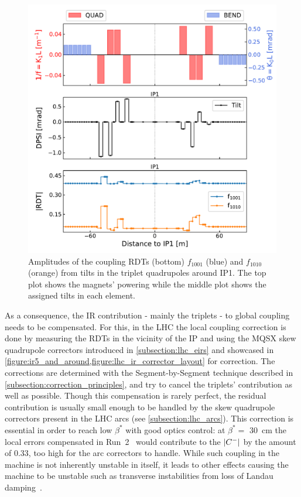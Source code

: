 \begin{figure}[!htb]
    \centering
    \includegraphics*[width=0.99\columnwidth]{Figures/IR_Coupling_Correction/triplet_tilts_to_rdts.pdf}
    \caption{Amplitudes of the coupling RDTs (bottom) \(f_{1001}\) (\textcolor{mplblue}{blue}) and \(f_{1010}\) (\textcolor{mplorange}{orange}) from tilts in the triplet quadrupoles around IP\num{1}. The top plot shows the magnets' powering while the middle plot shows the assigned tilts in each element.}
    \label{figure:triplet_tilts_to_rdts}
\end{figure}

As a consequence, the IR contribution - mainly the triplets - to global coupling needs to be compensated.
For this, in the LHC the local coupling correction is done by measuring the RDTs in the vicinity of the IP and using the MQSX skew quadrupole correctors introduced in \cref{subsection:lhc_eirs} and showcased in \cref{figure:ir5_and_around,figure:lhc_ir_corrector_layout} for correction.
The corrections are determined with the Segment-by-Segment technique described in \cref{subsection:correction_principles}, and try to cancel the triplets' contribution as well as possible.
Though this compensation is rarely perfect, the residual contribution is usually small enough to be handled by the skew quadrupole correctors present in the LHC arcs (see \cref{subsection:lhc_arcs}).
This correction is essential in order to reach low \(\beta^{\ast}\) with good optics control: at \(\beta^{*}=\) \qty{30}{\centi\meter} the local errors compensated in Run~\num{2}~\cite{CERN:Persson:LHCOpticsCorrectionsEvian2019} would contribute to the \(\left\lvert C^{-} \right\rvert\) by the amount of \num{0.33}, too high for the arc correctors to handle.
While such coupling in the machine is not inherently unstable in itself, it leads to other effects causing the machine to be unstable such as transverse instabilities from loss of Landau damping~\cite{MASTERS:Soubelet:Optics_Octupole_PyHEADTAIL,PRAB:Carver:Transverse_Instabilities_With_Coupling}.

